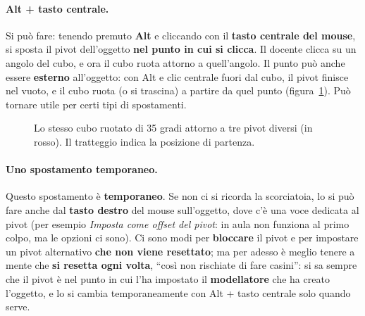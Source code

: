 \paragraph{Alt + tasto centrale.} Si può fare: tenendo premuto \textbf{Alt} e
cliccando con il \textbf{tasto centrale del mouse}, si sposta il pivot
dell'oggetto \textbf{nel punto in cui si clicca}. Il docente clicca su un angolo
del cubo, e ora il cubo ruota attorno a quell'angolo. Il punto può anche essere
\textbf{esterno} all'oggetto: con Alt e clic centrale fuori dal cubo, il pivot
finisce nel vuoto, e il cubo ruota (o si trascina) a partire da quel punto
(figura~\ref{gd11:fig:pivot}). Può tornare utile per certi tipi di
spostamenti.

\begin{figure}[htbp]
\centering
{}
\caption{Lo stesso cubo ruotato di 35 gradi attorno a tre pivot diversi (in
rosso). Il tratteggio indica la posizione di partenza.}
\label{gd11:fig:pivot}
\end{figure}

\paragraph{Uno spostamento temporaneo.} Questo spostamento è
\textbf{temporaneo}. Se non ci si ricorda la scorciatoia, lo si può fare anche
dal \textbf{tasto destro} del mouse sull'oggetto, dove c'è una voce dedicata al
pivot (per esempio \emph{Imposta come offset del pivot}: in aula non funziona al
primo colpo, ma le opzioni ci sono). Ci sono modi per \textbf{bloccare} il pivot
e per impostare un pivot alternativo \textbf{che non viene resettato}; ma per
adesso è meglio tenere a mente che \textbf{si resetta ogni volta}, ``così non
rischiate di fare casini'': si sa sempre che il pivot è nel punto in cui l'ha
impostato il \textbf{modellatore} che ha creato l'oggetto, e lo si cambia
temporaneamente con Alt + tasto centrale solo quando serve.

